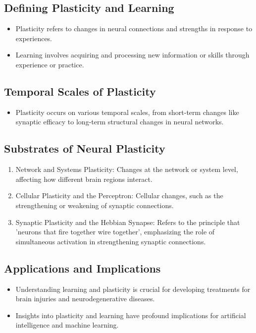 \documentclass{article}
\begin{document}
\subsection{Defining Plasticity and Learning}
\begin{itemize}
    \item Plasticity refers to changes in neural connections and strengths in response to experiences.
    \item Learning involves acquiring and processing new information or skills through experience or practice.
\end{itemize}

\subsection{Temporal Scales of Plasticity}
\begin{itemize}
    \item Plasticity occurs on various temporal scales, from short-term changes like synaptic efficacy to long-term structural changes in neural networks.
\end{itemize}

\subsection{Substrates of Neural Plasticity}
\begin{enumerate}
    \item Network and Systems Plasticity: Changes at the network or system level, affecting how different brain regions interact.
    \item Cellular Plasticity and the Perceptron: Cellular changes, such as the strengthening or weakening of synaptic connections.
    \item Synaptic Plasticity and the Hebbian Synapse: Refers to the principle that 'neurons that fire together wire together', emphasizing the role of simultaneous activation in strengthening synaptic connections.
\end{enumerate}

\subsection{Applications and Implications}
\begin{itemize}
    \item Understanding learning and plasticity is crucial for developing treatments for brain injuries and neurodegenerative diseases.
    \item Insights into plasticity and learning have profound implications for artificial intelligence and machine learning.
\end{itemize}
\end{document}
